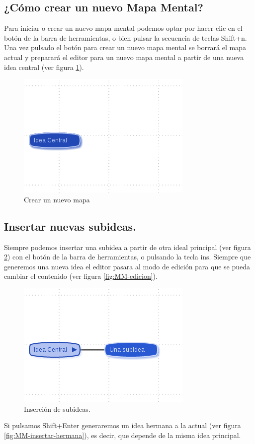 \subsection{¿Cómo crear un nuevo Mapa Mental?}
Para iniciar o crear un nuevo mapa mental podemos optar por hacer clic en el botón de la barra de herramientas, o bien pulsar la secuencia de teclas Shift+n. Una vez pulsado el botón para crear un nuevo mapa mental se borrará el mapa actual y preparará el editor para un nuevo mapa mental a partir de una nueva idea central (ver figura \ref{fig:MM-nuevo}).

\begin{figure}[tbph]
\centering
\includegraphics[width=0.4\linewidth]{imagenes/MM-nuevo.png}
\caption{Crear un nuevo mapa}
\label{fig:MM-nuevo}
\end{figure}


\subsection{Insertar nuevas subideas.}
Siempre podemos insertar una subidea a partir de otra ideal principal (ver figura \ref{fig:MM-insertar}) con el botón de la barra de herramientas, o pulsando la tecla ins. Siempre que generemos una nueva idea el editor pasara al modo de edición para que se pueda cambiar el contenido (ver figura \ref{fig:MM-edicion}). 

\begin{figure}[tbph]
\centering
\includegraphics[width=0.4\linewidth]{imagenes/MM-insertar.png}
\caption{Inserción de subideas.}
\label{fig:MM-insertar}
\end{figure}

Si pulsamos Shift+Enter generaremos un idea hermana a la actual (ver figura \ref{fig:MM-insertar-hermana}), es decir, que depende de la misma idea principal. 

